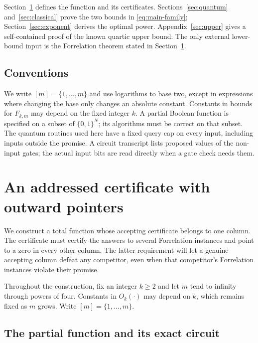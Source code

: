 \documentclass[11pt]{article}
\theoremstyle{definition}
\newcommand{\bits}{\{0,1\}}
\begin{document}
Section~\ref{sec:construction} defines the function and its certificates.
Sections~\ref{sec:quantum} and~\ref{sec:classical} prove the two bounds in
\eqref{eq:main-family}; Section~\ref{sec:exponent} derives the optimal
power. Appendix~\ref{sec:upper} gives a self-contained proof of the known
quartic upper bound. The only external lower-bound input is the
Forrelation theorem stated in Section~\ref{sec:construction}.

\subsection{Conventions}

We write $[m]=\{1,\ldots,m\}$ and use logarithms to base two, except in
expressions where changing the base only changes an absolute constant.
Constants in bounds for $F_{k,m}$ may depend on the fixed integer $k$.
A partial Boolean function is specified on a subset of $\bits^N$;
its algorithms must be correct on that subset. The quantum routines used
here have a fixed query cap on every input, including inputs outside the
promise. A circuit transcript lists proposed values of the non-input
gates; the actual input bits are read directly when a gate check needs them.

\section{An addressed certificate with outward pointers}
\label{sec:construction}

We construct a total function whose accepting certificate belongs to one
column.  The certificate must certify the answers to several Forrelation
instances and point to a zero in every other column.  The latter requirement
will let a genuine accepting column defeat any competitor, even when that
competitor's Forrelation instances violate their promise.

Throughout the construction, fix an integer $k\geq 2$ and let $m$ tend to
infinity through powers of four.  Constants in $O_k(\cdot)$ may depend on
$k$, which remains fixed as $m$ grows.  Write $[m]=\{1,\ldots,m\}$.

\subsection{The partial function and its exact circuit}
\end{document}

